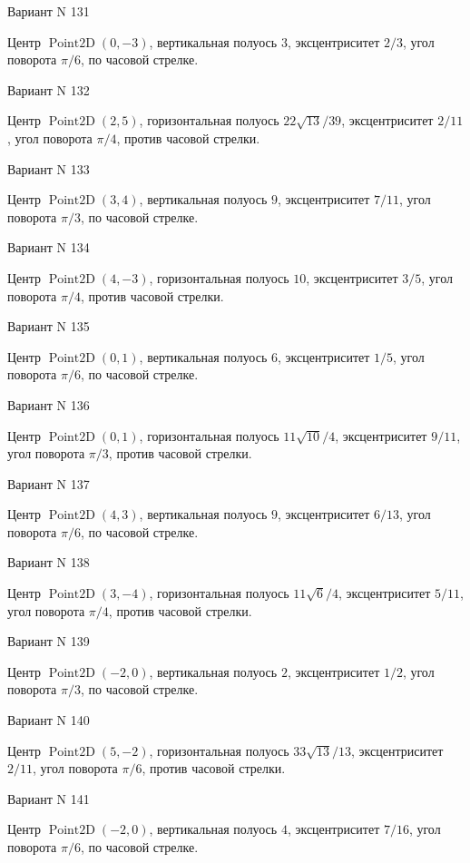 \documentclass[11pt]{report}
\begin{document}
Вариант N 131

Центр $\operatorname{Point2D}\left(0, -3\right)$, вертикальная полуось $3$, эксцентриситет $2 / 3$, угол поворота $\pi / 6$, по часовой стрелке.

Вариант N 132

Центр $\operatorname{Point2D}\left(2, 5\right)$, горизонтальная полуось $22 \sqrt{13} / 39$, эксцентриситет $2 / 11$, угол поворота $\pi / 4$, против часовой стрелки.

Вариант N 133

Центр $\operatorname{Point2D}\left(3, 4\right)$, вертикальная полуось $9$, эксцентриситет $7 / 11$, угол поворота $\pi / 3$, по часовой стрелке.

Вариант N 134

Центр $\operatorname{Point2D}\left(4, -3\right)$, горизонтальная полуось $10$, эксцентриситет $3 / 5$, угол поворота $\pi / 4$, против часовой стрелки.

Вариант N 135

Центр $\operatorname{Point2D}\left(0, 1\right)$, вертикальная полуось $6$, эксцентриситет $1 / 5$, угол поворота $\pi / 6$, по часовой стрелке.

Вариант N 136

Центр $\operatorname{Point2D}\left(0, 1\right)$, горизонтальная полуось $11 \sqrt{10} / 4$, эксцентриситет $9 / 11$, угол поворота $\pi / 3$, против часовой стрелки.

Вариант N 137

Центр $\operatorname{Point2D}\left(4, 3\right)$, вертикальная полуось $9$, эксцентриситет $6 / 13$, угол поворота $\pi / 6$, по часовой стрелке.

Вариант N 138

Центр $\operatorname{Point2D}\left(3, -4\right)$, горизонтальная полуось $11 \sqrt{6} / 4$, эксцентриситет $5 / 11$, угол поворота $\pi / 4$, против часовой стрелки.

Вариант N 139

Центр $\operatorname{Point2D}\left(-2, 0\right)$, вертикальная полуось $2$, эксцентриситет $1 / 2$, угол поворота $\pi / 3$, по часовой стрелке.

Вариант N 140

Центр $\operatorname{Point2D}\left(5, -2\right)$, горизонтальная полуось $33 \sqrt{13} / 13$, эксцентриситет $2 / 11$, угол поворота $\pi / 6$, против часовой стрелки.

Вариант N 141

Центр $\operatorname{Point2D}\left(-2, 0\right)$, вертикальная полуось $4$, эксцентриситет $7 / 16$, угол поворота $\pi / 6$, по часовой стрелке.
\end{document}
